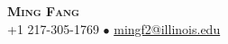 \documentclass[letterpaper,11pt]{article} %
\begin{document}

\begin{comment}
In Europe it is common to include a picture of ones self in the CV. Select
which heading appropriate for the document you are creating.
\end{comment}


\begin{center}
    \textbf{\Huge \scshape Ming Fang} \\ \vspace{1pt} %
    \small +1 217-305-1769 $\bullet$ 
    \href{mailto:mingf2@illinois.edu}{{mingf2@illinois.edu}}
\end{center}
\end{document}
